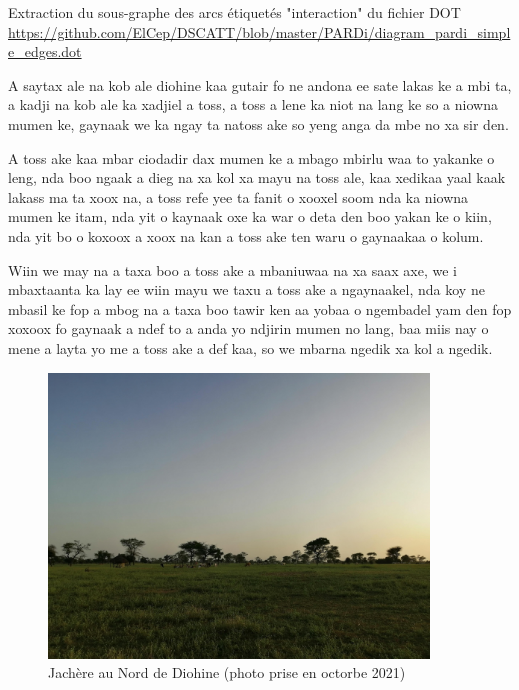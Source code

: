 \begin{paracol}{2}
  Extraction du sous-graphe des arcs étiquetés  "interaction" du fichier DOT \url{https://github.com/ElCep/DSCATT/blob/master/PARDi/diagram_pardi_simple_edges.dot}

\switchcolumn %

  A saytax ale na kob ale diohine kaa gutair fo ne andona ee sate lakas ke a mbi ta, a kadji na kob ale ka xadjiel a toss, a toss a lene ka niot na lang ke so a niowna mumen ke, gaynaak we ka ngay ta natoss ake so yeng anga da mbe no xa sir den.

  A toss ake kaa mbar ciodadir dax mumen ke a mbago mbirlu waa to yakanke o leng, nda boo ngaak a dieg na xa kol xa mayu na toss ale, kaa xedikaa yaal kaak lakass ma ta xoox na, a toss refe yee ta fanit o xooxel soom nda ka niowna mumen ke itam, nda yit o kaynaak oxe ka war o deta den boo yakan ke o kiin, nda yit bo o koxoox a xoox na kan a toss ake ten waru o gaynaakaa o kolum.

  Wiin we may na a taxa boo a toss ake a mbaniuwaa na xa saax axe, we i mbaxtaanta ka lay ee wiin mayu we taxu a toss ake a ngaynaakel, nda koy ne mbasil ke fop a mbog na a taxa boo tawir ken aa yobaa o ngembadel yam den fop xoxoox fo gaynaak a ndef to a anda yo ndjirin mumen no lang, baa miis nay o mene a layta yo me a toss ake a def kaa, so we mbarna ngedik xa kol a ngedik.

\end{paracol}


\begin{figure}
  \begin{center}
    \includegraphics[width=0.9\textwidth]{img/jachere.jpg}
  \end{center}
  \caption{Jachère au Nord de Diohine (photo prise en octorbe 2021)}
  \label{fig:photoJachere}
\end{figure}



